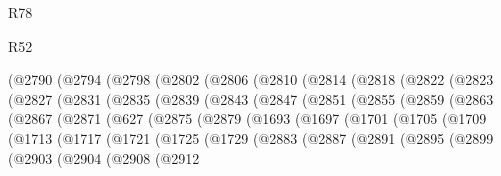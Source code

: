 \begin{lexlean}{R78}
\begin{lexlean}{R52}
\begin{coremodule}
{{{{{{{{{{{{{{{{{{{{{{{{{{{{{{{{{{{{{{{{{{{{{{{{{{{{{{{{{{{{{{{{{{{{{{{{{{{{{{{{{{{{{{{{{{{{{{{{{{{{{{{{{{{{{{{{{{{{{{{{{{{{{{{{{{{{{{{{{{{{{{{{{{{{{{{{{{{{{{{{{{{{{{{{{{{{{{{{{{{{{{{{{{{{{{{{{{{{{{          (@2790
            (@2794
              (@2798
                (@2802
                  (@2806
                    (@2810
                      (@2814
                        (@2818
                          (@2822
                            (@2823
                              (@2827
                                (@2831
                                  (@2835
                                    (@2839
                                      (@2843
                                        (@2847
                                          (@2851
                                            (@2855
                                              (@2859
                                                (@2863
                                                  (@2867
                                                    (@2871
                                                      (@627
                                                        (@2875
                                                          (@2879
                                                            (@1693
                                                              (@1697
                                                                (@1701
                                                                  (@1705
                                                                    (@1709
                                                                      (@1713
                                                                        (@1717
                                                                          (@1721
                                                                            (@1725
                                                                              (@1729
                                                                                (@2883
                                                                                  (@2887
                                                                                    (@2891
                                                                                      (@2895
                                                                                        (@2899
                                                                                          (@2903
                                                                                            (@2904
                                                                                              (@2908
                                                                                                (@2912
}}}}}}}}}}}}}}}}}}}}}}}}}}}}}}}}}}}}}}}}}}}}}}}}}}}}}}}}}}}}}}}}}}}}}}}}}}}}}}}}}}}}}}}}}}}}}}}}}}}}}}}}}}}}}}}}}}}}}}}}}}}}}}}}}}}}}}}}}}}}}}}}}}}}}}}}}}}}}}}}}}}}}}}}}}}}}}}}}}}}}}}}}}}}}}}}}}}}}}
\end{coremodule}
\end{lexlean}
\end{lexlean}
